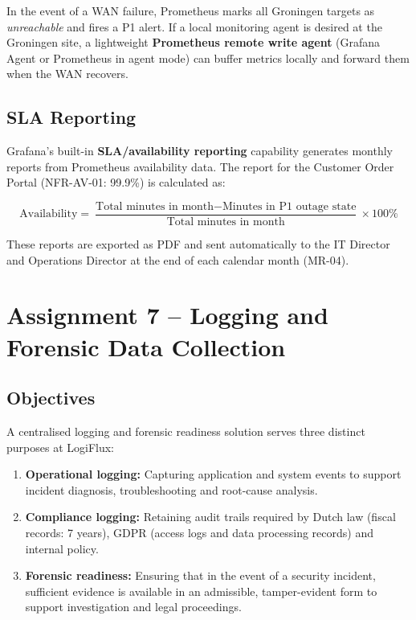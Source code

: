 In the event of a WAN failure, Prometheus marks all Groningen targets as \textit{unreachable} and fires a P1 alert. If a local monitoring agent is desired at the Groningen site, a lightweight \textbf{Prometheus remote write agent} (Grafana Agent or Prometheus in agent mode) can buffer metrics locally and forward them when the WAN recovers.

\subsection{SLA Reporting}

Grafana's built-in \textbf{SLA/availability reporting} capability generates monthly reports from Prometheus availability data. The report for the Customer Order Portal (NFR-AV-01: 99.9\%) is calculated as:

\[
\text{Availability} = \frac{\text{Total minutes in month} - \text{Minutes in P1 outage state}}{\text{Total minutes in month}} \times 100\%
\]

These reports are exported as PDF and sent automatically to the IT Director and Operations Director at the end of each calendar month (MR-04).

\section{Assignment 7 -- Logging and Forensic Data Collection}
\label{sec:assignment7}

\subsection{Objectives}

A centralised logging and forensic readiness solution serves three distinct purposes at LogiFlux:

\begin{enumerate}
    \item \textbf{Operational logging:} Capturing application and system events to support incident diagnosis, troubleshooting and root-cause analysis.
    \item \textbf{Compliance logging:} Retaining audit trails required by Dutch law (fiscal records: 7 years), GDPR (access logs and data processing records) and internal policy.
    \item \textbf{Forensic readiness:} Ensuring that in the event of a security incident, sufficient evidence is available in an admissible, tamper-evident form to support investigation and legal proceedings.
\end{enumerate}

